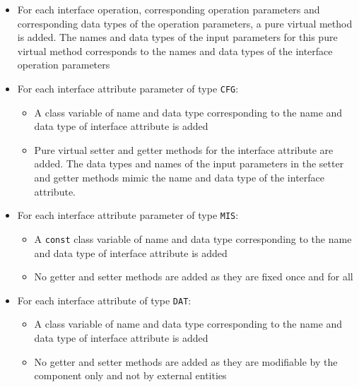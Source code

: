 \begin{itemize}
\item For each interface operation, corresponding operation parameters and corresponding data types of the operation parameters, a pure virtual method is added. The names and data types of the input parameters for this pure virtual method corresponds to the names and data types of the interface operation parameters 
\item For each interface attribute parameter of type \texttt{CFG}:
\begin{itemize}
\item A class variable of name and data type corresponding to the name and data type of interface attribute is added
\item Pure virtual setter and getter methods for the interface attribute are added. The data types and names of the input parameters in the setter and getter methods mimic the name and data type of the interface attribute.
\end{itemize} 
\item For each interface attribute parameter of type \texttt{MIS}: 
\begin{itemize}
\item A \texttt{const} class variable of name and data type corresponding to the name and data type of interface attribute is added
\item No getter and setter methods are added as they are fixed once and for all \cite{SpecMetamodel}
\end{itemize}
\item For each interface attribute of type \texttt{DAT}:
\begin{itemize}
\item A class variable of name and data type corresponding to the name and data type of interface attribute is added
\item No getter and setter methods are added as they are modifiable by the component only and not by external entities \cite{SpecMetamodel}  
\end{itemize}   
\end{itemize}


